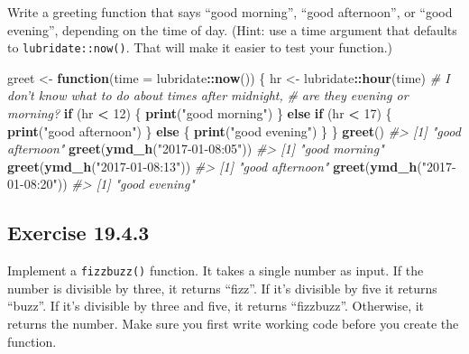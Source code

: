 \documentclass[]{book}
\newenvironment{Shaded}{\begin{snugshade}}{\end{snugshade}}
\newcommand{\CommentTok}[1]{\textcolor[rgb]{0.56,0.35,0.01}{\textit{#1}}}
\newcommand{\ControlFlowTok}[1]{\textcolor[rgb]{0.13,0.29,0.53}{\textbf{#1}}}
\newcommand{\DataTypeTok}[1]{\textcolor[rgb]{0.13,0.29,0.53}{#1}}
\newcommand{\DecValTok}[1]{\textcolor[rgb]{0.00,0.00,0.81}{#1}}
\newcommand{\KeywordTok}[1]{\textcolor[rgb]{0.13,0.29,0.53}{\textbf{#1}}}
\newcommand{\NormalTok}[1]{#1}
\newcommand{\OperatorTok}[1]{\textcolor[rgb]{0.81,0.36,0.00}{\textbf{#1}}}
\newcommand{\StringTok}[1]{\textcolor[rgb]{0.31,0.60,0.02}{#1}}
\theoremstyle{plain}
\theoremstyle{remark}
\theoremstyle{definition}
\theoremstyle{definition}
\theoremstyle{definition}
\theoremstyle{remark}
\begin{document}
Write a greeting function that says ``good morning'', ``good
afternoon'', or ``good evening'', depending on the time of day. (Hint:
use a time argument that defaults to \texttt{lubridate::now()}. That
will make it easier to test your function.)

\begin{Shaded}
\begin{Highlighting}[]
\NormalTok{greet <-}\StringTok{ }\ControlFlowTok{function}\NormalTok{(}\DataTypeTok{time =}\NormalTok{ lubridate}\OperatorTok{::}\KeywordTok{now}\NormalTok{()) \{}
\NormalTok{  hr <-}\StringTok{ }\NormalTok{lubridate}\OperatorTok{::}\KeywordTok{hour}\NormalTok{(time)}
  \CommentTok{# I don't know what to do about times after midnight,}
  \CommentTok{# are they evening or morning?}
  \ControlFlowTok{if}\NormalTok{ (hr }\OperatorTok{<}\StringTok{ }\DecValTok{12}\NormalTok{) \{}
    \KeywordTok{print}\NormalTok{(}\StringTok{"good morning"}\NormalTok{)}
\NormalTok{  \} }\ControlFlowTok{else} \ControlFlowTok{if}\NormalTok{ (hr }\OperatorTok{<}\StringTok{ }\DecValTok{17}\NormalTok{) \{}
    \KeywordTok{print}\NormalTok{(}\StringTok{"good afternoon"}\NormalTok{)}
\NormalTok{  \} }\ControlFlowTok{else}\NormalTok{ \{}
    \KeywordTok{print}\NormalTok{(}\StringTok{"good evening"}\NormalTok{)}
\NormalTok{  \}}
\NormalTok{\}}
\KeywordTok{greet}\NormalTok{()}
\CommentTok{#> [1] "good afternoon"}
\KeywordTok{greet}\NormalTok{(}\KeywordTok{ymd_h}\NormalTok{(}\StringTok{"2017-01-08:05"}\NormalTok{))}
\CommentTok{#> [1] "good morning"}
\KeywordTok{greet}\NormalTok{(}\KeywordTok{ymd_h}\NormalTok{(}\StringTok{"2017-01-08:13"}\NormalTok{))}
\CommentTok{#> [1] "good afternoon"}
\KeywordTok{greet}\NormalTok{(}\KeywordTok{ymd_h}\NormalTok{(}\StringTok{"2017-01-08:20"}\NormalTok{))}
\CommentTok{#> [1] "good evening"}
\end{Highlighting}
\end{Shaded}

\hypertarget{exercise-19.4.3}{%
\subsection*{\texorpdfstring{Exercise
{19.4.3}}{Exercise 19.4.3}}\label{exercise-19.4.3}}

Implement a \texttt{fizzbuzz()} function. It takes a single number as
input. If the number is divisible by three, it returns ``fizz''. If it's
divisible by five it returns ``buzz''. If it's divisible by three and
five, it returns ``fizzbuzz''. Otherwise, it returns the number. Make
sure you first write working code before you create the function.
\end{document}
